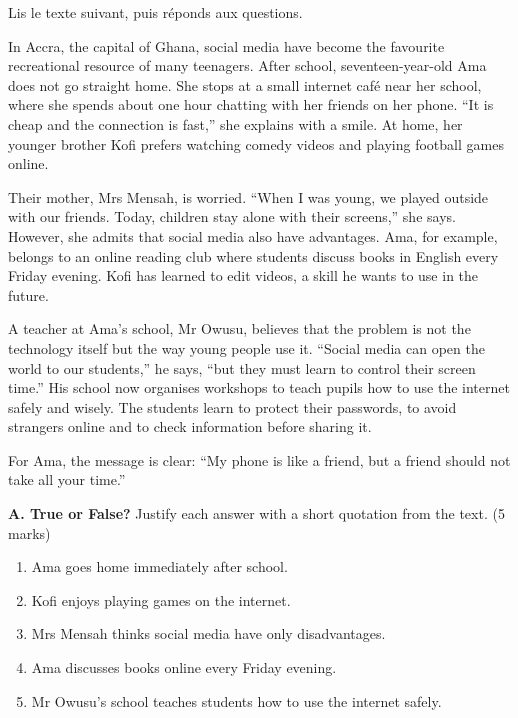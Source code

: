 \documentclass[11pt]{article}
\begin{document}
\begin{exercice}
Lis le texte suivant, puis réponds aux questions.

\begin{textebox}
In Accra, the capital of Ghana, social media have become the favourite recreational resource of many teenagers. After school, seventeen-year-old Ama does not go straight home. She stops at a small internet café near her school, where she spends about one hour chatting with her friends on her phone. “It is cheap and the connection is fast,” she explains with a smile. At home, her younger brother Kofi prefers watching comedy videos and playing football games online.

Their mother, Mrs Mensah, is worried. “When I was young, we played outside with our friends. Today, children stay alone with their screens,” she says. However, she admits that social media also have advantages. Ama, for example, belongs to an online reading club where students discuss books in English every Friday evening. Kofi has learned to edit videos, a skill he wants to use in the future.

A teacher at Ama's school, Mr Owusu, believes that the problem is not the technology itself but the way young people use it. “Social media can open the world to our students,” he says, “but they must learn to control their screen time.” His school now organises workshops to teach pupils how to use the internet safely and wisely. The students learn to protect their passwords, to avoid strangers online and to check information before sharing it.

For Ama, the message is clear: “My phone is like a friend, but a friend should not take all your time.”
\end{textebox}

\textbf{A. True or False?} Justify each answer with a short quotation from the text. (5 marks)
\begin{enumerate}
\item Ama goes home immediately after school.
\item Kofi enjoys playing games on the internet.
\item Mrs Mensah thinks social media have only disadvantages.
\item Ama discusses books online every Friday evening.
\item Mr Owusu's school teaches students how to use the internet safely.
\end{enumerate}


\end{exercice}
\end{document}

